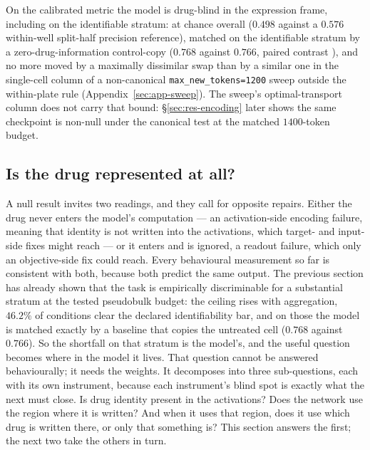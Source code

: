 \begin{claim}
On the calibrated metric the model is drug-blind in the expression frame, including on the
identifiable stratum: at chance overall ($0.498$ against a $0.576$ within-well split-half
precision reference), matched on the identifiable stratum by a
zero-drug-information control-copy ($0.768$ against $0.766$, paired contrast
), and
no more moved by a maximally dissimilar swap than by a similar one in the single-cell column of a
non-canonical \texttt{max\_new\_tokens=1200} sweep outside the within-plate rule
(Appendix~\ref{sec:app-sweep}). The sweep's optimal-transport column does not carry that bound:
\S\ref{sec:res-encoding} later shows the same checkpoint is non-null under the canonical test at the
matched $1400$-token budget.
\end{claim}

\subsection{Is the drug represented at all?}
\label{sec:methods-probe}

A null result invites two readings, and they call for opposite repairs. Either the drug never
enters the model's computation --- an activation-side encoding failure, meaning that identity is not
written into the activations, which target- and input-side fixes might reach --- or it enters and is
ignored, a readout failure, which only an objective-side fix could reach. Every behavioural
measurement so far is consistent with both, because both predict the same
output. The previous section has already shown that the task is empirically discriminable for a
substantial stratum at the tested pseudobulk budget: the ceiling rises with aggregation, $46.2\%$ of
conditions clear the declared identifiability bar, and on those the model is matched exactly by a
baseline that copies the untreated cell ($0.768$ against $0.766$). So the shortfall on that stratum
is the model's, and the useful question becomes
where in the model it lives. That question cannot be answered behaviourally; it needs the weights.
It decomposes into three sub-questions, each with its own instrument, because each instrument's
blind spot is exactly what the next must close. Is drug identity present in the activations? Does
the network use the region where it is written? And when it uses that region, does it use which drug
is written there, or only that something is? This section answers the first; the next two take the
others in turn.

